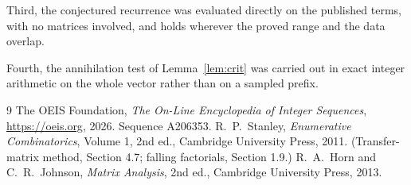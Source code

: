 \documentclass[11pt,a4paper]{article}
\theoremstyle{plain}
\theoremstyle{definition}
\begin{document}
Third, the conjectured recurrence was evaluated directly on the published terms, with no
matrices involved, and holds wherever the proved range and the data overlap.

Fourth, the annihilation test of Lemma~\ref{lem:crit} was carried out in exact integer
arithmetic on the whole vector rather than on a sampled prefix.

\begin{thebibliography}{9}
 The OEIS Foundation, \emph{The On-Line Encyclopedia of Integer
Sequences}, \url{https://oeis.org}, 2026. Sequence A206353.
 R.~P.~Stanley, \emph{Enumerative Combinatorics}, Volume 1, 2nd ed.,
Cambridge University Press, 2011. (Transfer-matrix method, Section 4.7; falling factorials,
Section 1.9.)
 R.~A.~Horn and C.~R.~Johnson, \emph{Matrix Analysis}, 2nd ed., Cambridge
University Press, 2013.
\end{thebibliography}
\end{document}
